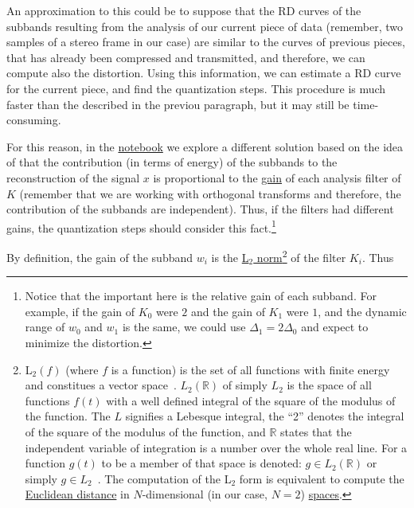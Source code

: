 An approximation to this could be to suppose that the RD curves of the
subbands resulting from the analysis of our current piece of data
(remember, two samples of a stereo frame in our case) are similar to
the curves of previous pieces, that has already been compressed and
transmitted, and therefore, we can compute also the distortion. Using
this information, we can estimate a RD curve for the current piece,
and find the quantization steps. This procedure is much faster than
the described in the previou paragraph, but it may still be
time-consuming.

For this reason, in
the \href{https://github.com/Tecnologias-multimedia/intercom/blob/master/docs/stereo_transforms_RD.ipynb}{notebook}
we explore a different solution based on the idea of that the contribution
(in terms of energy) of the subbands to the reconstruction of the
signal $x$ is proportional to the
\href{https://en.wikipedia.org/wiki/Filter_(signal_processing)}{gain}
of each analysis filter of $K$ (remember that we are working with
orthogonal transforms and therefore, the contribution of the subbands
are independent).  Thus, if the filters had different gains, the
quantization steps should consider this fact.\footnote{Notice that the
important here is the relative gain of each subband. For example, if
the gain of $K_0$ were $2$ and the gain of $K_1$ were $1$, and the
dynamic range of $w_0$ and $w_1$ is the same, we could use
$\Delta_1=2\Delta_0$ and expect to minimize the distortion.}

By definition, the gain of the subband
$w_i$ is the \href{https://en.wikipedia.org/wiki/Lp_space}{L$_2$
  norm}\footnote{L$_2(f)$ (where $f$ is a function) is the set of all
  functions with finite energy and constitues a vector
  space~\cite{sayood2017introduction}. $L_2({\mathbb R})$ of simply
  $L_2$ is the space of all functions $f(t)$ with a well defined
  integral of the square of the modulus of the function. The $L$
  signifies a Lebesque integral, the ``2'' denotes the integral of the
  square of the modulus of the function, and ${\mathbb R}$ states that
  the independent variable of integration is a number over the whole
  real line. For a function $g(t)$ to be a member of that space is
  denoted: $g\in L_2({\mathbb R})$ or simply
  $g\in L_2$~\cite{burrus2013wavelets}. The computation of the L$_2$
  form is equivalent to compute the
  \href{https://en.wikipedia.org/wiki/Euclidean_distance}{Euclidean
    distance} in $N$-dimensional (in our case, $N=2$)
  \href{https://en.wikipedia.org/wiki/Vector_space}{spaces}.} of the
filter $K_i$. Thus

